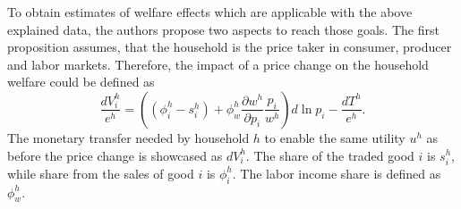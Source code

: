 To obtain estimates of welfare effects which are applicable with the above explained data, the authors propose two aspects
to reach those goals. The first proposition assumes, that the household is the price taker in consumer, producer and labor markets.
Therefore, the impact of a price change on the household welfare could be defined as
\begin{equation} \label{eq:equation4}
    \frac{dV_{i}^h}{e^h}=((\phi_{i}^h-s_{i}^h)+\phi_{w}^h \frac{\partial w^h}{\partial p_{i}} \frac{p_{i}}{w^h}) d\ln p_{i} -
    \frac{dT^h}{e^h}.
\end{equation}
The monetary transfer needed by household \(h\) to enable the same utility \(u^h\) as before the price change is showcased as 
\(dV_{i}^h\). The share of the traded good \(i\) is \(s_{i}^h\), while share from the sales of good \(i\) is \(\phi_{i}^h\).
The labor income share is defined as \(\phi_{w}^h\).\\

